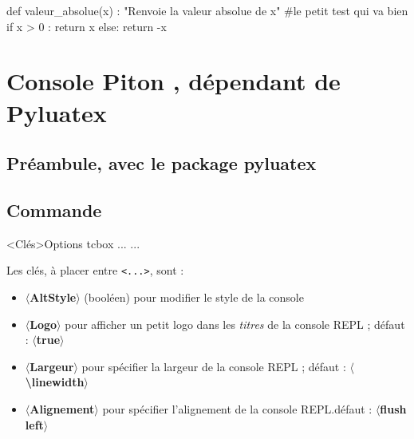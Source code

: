 \documentclass[french,a4paper,10pt]{article}
\begin{document}
\begin{CodePiton}[Style=Onglet,Couleur=red,Largeur=11cm,Filigrane,Alignement=flush left,Lignes=false]{}
def valeur_absolue(x) :
	"Renvoie la valeur absolue de x"
	#le petit test qui va bien
	if x > 0 :
		return x
	else:
		return -x
\end{CodePiton}

\pagebreak

\section{Console \og Piton \fg{}, dépendant de Pyluatex}

\subsection{Préambule, avec le package pyluatex}

{\small {}}

\subsection{Commande}

{\small \begin{codehigh}
\begin{ConsolePiton}<Clés>{Options tcbox}
...
...
\end{ConsolePiton}
\end{codehigh}}

\medskip

Les clés, à placer entre \texttt{<...>}, sont :

\begin{itemize}
	\item \textbf{\textsf{$\langle$AltStyle$\rangle$}} (booléen) pour modifier le style de la console
	\item \textbf{\textsf{$\langle$Logo$\rangle$}} pour afficher un petit logo dans les \textit{titres} de la console REPL ; \hfill{}défaut : \textbf{\textsf{$\langle$true$\rangle$}}
	\item \textbf{\textsf{$\langle$Largeur$\rangle$}} pour spécifier la largeur de la console REPL ; \hfill{}défaut : \textbf{\textsf{$\langle$\textbackslash{}linewidth$\rangle$}}
	\item \textbf{\textsf{$\langle$Alignement$\rangle$}} pour spécifier l'alignement de la console REPL.\hfill{}défaut : \textbf{\textsf{$\langle$flush left$\rangle$}}
\end{itemize}
\end{document}
